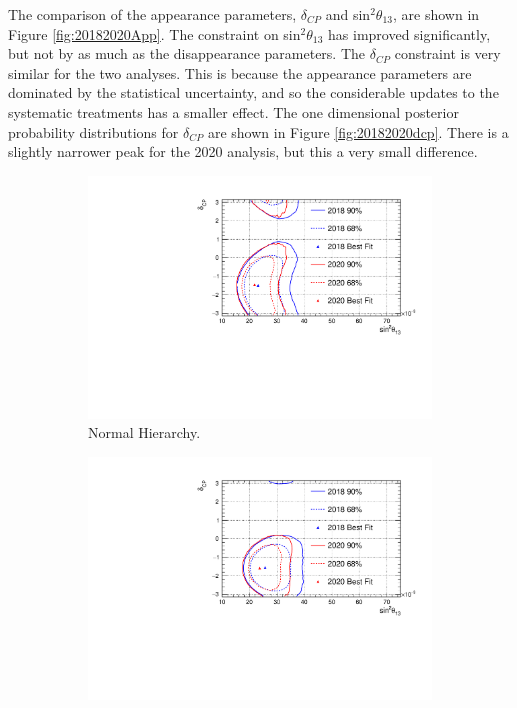 The comparison of the appearance parameters, $\delta_{CP}$ and sin$^{2}\theta_{13}$, are shown in Figure \ref{fig:20182020App}. The constraint on sin$^{2}\theta_{13}$ has improved significantly, but not by as much as the disappearance parameters. The $\delta_{CP}$ constraint is very similar for the two analyses. This is because the appearance parameters are dominated by the statistical uncertainty, and so the considerable updates to the systematic treatments has a smaller effect. The one dimensional posterior probability distributions for $\delta_{CP}$ are shown in Figure \ref{fig:20182020dcp}. There is a slightly narrower peak for the 2020 analysis, but this a very small difference.

\begin{figure}[!htbp]
\centering
\begin{subfigure}{.7\textwidth}
  \centering
  \includegraphics[width=0.95\linewidth]{figs/compMaCh3Contours_20182020/compMaCh3Contours_20182020_woRC_app_data_NH}
  \caption{Normal Hierarchy.}
  \label{fig:20182020AppNH}
\end{subfigure}
\begin{subfigure}{.7\textwidth}
  \centering
  \includegraphics[width=0.95\linewidth]{figs/compMaCh3Contours_20182020/compMaCh3Contours_20182020_woRC_app_data_IH}

\end{subfigure}
\end{figure}
